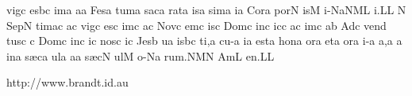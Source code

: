 \sgn vig\punctum c\egn
\sgn {}es\pes bc\egn
\sgn {}im\punctum a\egn
\sgn {}a{}\punctum a\egn
\spatium
\sgn Fes\punctum a\egn
\sgn tum\punctum a\egn
\spatium
\sgn sac\punctum a\egn
\sgn rat\punctum a\egn
\sgn {}is\punctum a\egn
\sgn sim\punctum a\egn
\sgn {}i{}\punctum a\egn
\spatium
\sgn Cor\punctum a\egn
\sgn por\punctum N\egn
\sgn {}is\punctum M\egn
\spatium
{}i-\pessubbipunctis NaNM\nonspatium\punctuminclinatum L\egn
{}i.\punctum L\augmentum L\egn
\spatium
\divisiofinalis
\spatium
\custos N
\lineaproxima
\sgn Sep\punctum N\egn
\sgn tim\pes ac\egn
\sgn {}a{}\punctum c\egn
\spatium
\sgn vig\punctum c\egn
\sgn {}es\punctum c\egn
\sgn {}im\punctum c\egn
\sgn {}a{}\punctum c\egn
\spatium
\sgn Nov\punctum c\egn
\sgn {}em\punctum c\egn
{}is\punctum c\egn
\spatium
\sgn Dom\punctum c\egn
\sgn {}in\punctum c\egn
\sgn {}ic\punctum c\egn
\sgn {}a{}\punctum c\egn
\spatium
{}im\punctum c\egn
\sgn {}a{}\punctum b\egn
\spatium
\sgn {}Ad\punctum c\egn
\sgn ven\punctum d\egn
\sgn tus\punctum c\egn
\spatium
\custos c
\lineaproxima
\sgn Dom\punctum c\egn
\sgn {}in\punctum c\egn
\sgn {}i{}\punctum c\egn
\spatium
\sgn nos\punctum c\egn
{}i{}\punctum c\egn
\spatium
\sgn Jes\punctum b\egn
\sgn {}u{}\punctum a\egn
\spatium
{}is\pes bc\egn
\sgn ti,\punctum a\egn
\spatium
\divisiominima
\spatium
\sgn cu-\punctum a\egn
\sgn {}i{}\punctum a\egn
\spatium
\sgn {}e{st}\punctum a\egn
\spatium
\sgn hon\punctum a\egn
\sgn {}or\punctum a\egn
\spatium
\sgn {}et\punctum a\egn
\spatium
{}or\punctum a\egn
\sgn {}i-\punctum a\egn
\sgn {}a,\punctum a\egn
\spatium
\custos a
\lineaproxima
\sgn {}in\punctum a\egn
\spatium
\sgn s{\ae}c\punctum a\egn
\sgn {}ul\punctum a\egn
\sgn {}a{}\punctum a\egn
\spatium
\sgn s{\ae}c\punctum N\egn
\sgn {}ul\punctum M\egn
\sgn {}o-\pes Na\egn
\sgn ru{m.}\clivis NM\augmentum N\egn
\spatium
\divisiomaior
\spatium
\sgn { }Am\punctum L\egn
\sgn {}e{n.}\punctum L\augmentum L\egn
\spatium
\Finisgregoriana

\vfill

\centerline{http://www.brandt.id.au}

\eject

\bye
